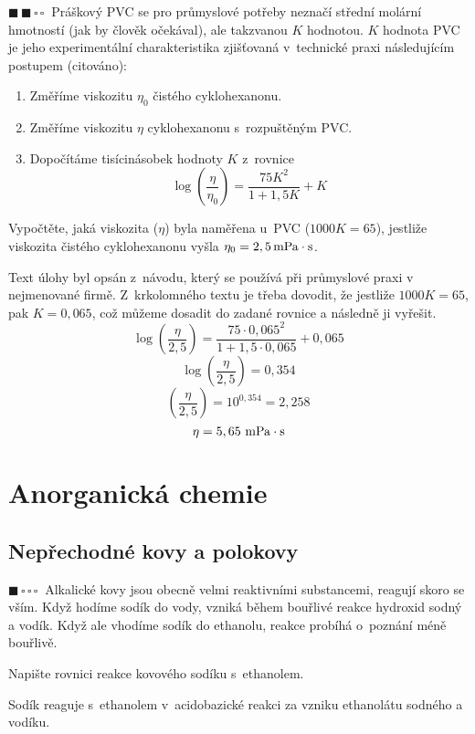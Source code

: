 \documentclass{book}
\newcommand{\jeden}{$\blacksquare \, \square \, \square \, \square \; \; $}
\newcommand{\dva}{$\blacksquare \, \blacksquare \, \square \, \square \; \; $}
\renewenvironment{quotation}{\par}{\par} %
\begin{document}
\hrulefill %
\begin{quotation}
\dva Práškový PVC se pro průmyslové potřeby neznačí střední molární
hmotností (jak by člověk očekával), ale takzvanou $K$ hodnotou. $K$
hodnota PVC je jeho experimentální charakteristika zjišťovaná v~technické
praxi následujícím postupem (citováno): 
\begin{enumerate}
\item Změříme viskozitu $\eta_{0}$ čistého cyklohexanonu. 
\item Změříme viskozitu $\eta$ cyklohexanonu s~rozpuštěným PVC. 
\item Dopočítáme tisícinásobek hodnoty $K$ z~rovnice 
\[
\log\left(\frac{\eta}{\eta_{0}}\right)=\frac{75K^{2}}{1+1,5K}+K
\]
\end{enumerate}
Vypočtěte, jaká viskozita ($\eta$) byla naměřena u~PVC ($1000K=65$),
jestliže viskozita čistého cyklohexanonu vyšla $\eta_{0}=2,5\,\mathrm{mPa\cdot\-s}$.
\end{quotation} \dotfill \par 
Text úlohy byl opsán z~návodu, který se používá při průmyslové praxi
v nejmenované firmě. Z~krkolomného textu je třeba dovodit, že jestliže
$1000K=65$, pak $K=0,065$, což můžeme dosadit do zadané rovnice a následně ji vyřešit.
\[
\log\left(\frac{\eta}{2,5}\right)=\frac{75\cdot0,065^{2}}{1+1,5\cdot0,065}+0,065
\]
\[
\log\left(\frac{\eta}{2,5}\right)=0,354
\]
\[
\left(\frac{\eta}{2,5}\right)=10^{0,354}=2,258
\]
\[
\eta=5,65\mathrm{\ mPa\cdot\-s}
\]


\chapter{Anorganická chemie}

\section{Nepřechodné kovy a polokovy}

\begin{quotation}
\jeden Alkalické kovy jsou obecně velmi reaktivními substancemi, reagují
skoro se vším. Když hodíme sodík do vody, vzniká během bouřlivé reakce
hydroxid sodný a vodík. Když ale vhodíme sodík do ethanolu, reakce
probíhá o~poznání méně bouřlivě. 

Napište rovnici reakce kovového sodíku s~ethanolem. 
\end{quotation} \dotfill \par 
Sodík reaguje s~ethanolem v~acidobazické reakci za vzniku ethanolátu
sodného a vodíku.
\end{document}
